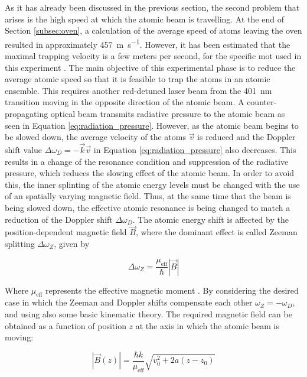 As it has already been discussed in the previous section, the second problem that arises is the high speed at which the atomic beam is travelling. At the end of Section \ref{subsec:oven}, a calculation of the average speed of atoms leaving the oven resulted in approximately \SI{457}{\meter\per\second}. However, it has been estimated that the maximal trapping velocity is a few meters per second, for the specific \acl{mot} used in this experiment \cite{Ulitzsch2016}. The main objective of this experimental phase is to reduce the average atomic speed so that it is feasible to trap the atoms in an atomic ensemble. This requires another red-detuned laser beam from the \SI{401}{\nano\meter} transition moving in the opposite direction of the atomic beam. A counter-propagating optical beam transmits radiative pressure to the atomic beam as seen in Equation \eqref{eq:radiation_pressure}. However, as the atomic beam begins to be slowed down, the average velocity of the atoms $\vec{v}$ is reduced and the Doppler shift value $\Delta \omega_D = -\vec{k}\vec{v}$ in Equation \eqref{eq:radiation_pressure} also decreases. This results in a change of the resonance condition and suppression of the radiative pressure, which reduces the slowing effect of the atomic beam. In order to avoid this, the inner splinting of the atomic energy levels must be changed with the use of an spatially varying magnetic field. Thus, at the same time that the beam is being slowed down, the effective atomic resonance is being changed to match a reduction of the Doppler shift $\Delta \omega_D$. The atomic energy shift is affected by the position-dependent magnetic field $\vec{B}$, where the dominant effect is called Zeeman splitting $\Delta \omega_Z$, given by \cite{Zeeman1897}

\begin{equation}
	\Delta \omega_Z = \frac{\mu_{\text{eff}}}{\hbar} |\vec{B}|
\end{equation}

Where $\mu_{\text{eff}}$ represents the effective magnetic moment \cite{Metcalf1999}. By considering the desired case in which the Zeeman and Doppler shifts compensate each other $\omega_Z = -\omega_D$, and using also some basic kinematic theory. The required magnetic field can be obtained as a function of position $z$ at the axis in which the atomic beam is moving:

\begin{equation}\label{eq:magnetic_field_zeeman_slower}
	|\vec{B}(z)| = \frac{\hbar k}{\mu_{\text{eff}}}\sqrt{v_0^2 + 2 a(z-z_0)}
\end{equation}

